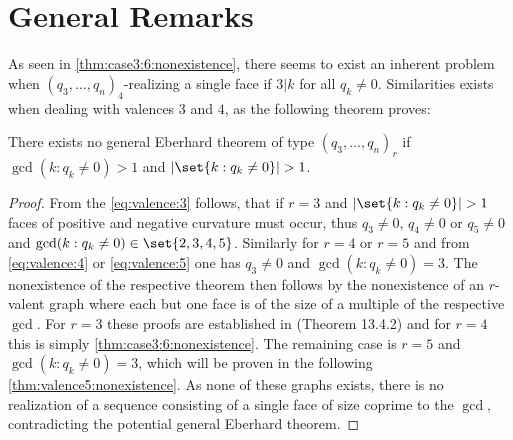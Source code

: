 \section{General Remarks}

As seen in \autoref{thm:case3:6:nonexistence}, there seems to exist an inherent problem when $(q_3, \dots, q_n)_4$-realizing a single face if $3 | k$ for all $q_k \neq 0$. Similarities exists when dealing with valences $3$ and $4$, as the following theorem proves:

\begin{theorem}
  There exists no general Eberhard theorem of type $(q_3, \dots, q_n)_r$ if $\gcd (k : q_k \neq 0) > 1$ and $|\set{k : q_k \neq 0}|>1$.
  \begin{proof}
    From the \autoref{eq:valence:3} follows, that if $r=3$ and $|\set{k : q_k \neq 0}|>1$ faces of positive and negative curvature must occur, thus $q_3 \neq 0$, $q_4 \neq 0$ or $q_5 \neq 0$ and $\gcd (k : q_k \neq 0) \in \set{2, 3, 4, 5}$. Similarly for $r=4$ or $r=5$ and from \autoref{eq:valence:4} or \autoref{eq:valence:5} one has $q_3 \neq 0$ and $\gcd (k : q_k \neq 0) = 3$. The nonexistence of the respective theorem then follows by the nonexistence of an $r$-valent graph where each but one face is of the size of a multiple of the respective $\gcd$. For $r = 3$ these proofs are established in \cite{ConvexPolytopes} (Theorem 13.4.2) and for $r=4$ this is simply \autoref{thm:case3:6:nonexistence}. The remaining case is $r=5$ and $\gcd (k : q_k \neq 0) = 3$, which will be proven in the following \autoref{thm:valence5:nonexistence}. As none of these graphs exists, there is no realization of a sequence consisting of a single face of size coprime to the $\gcd$, contradicting the potential general Eberhard theorem.
  \end{proof}
\end{theorem}

